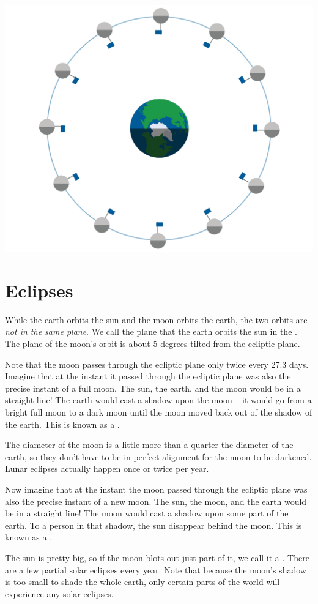 \includegraphics[width=.7\textwidth]{moonCircleRotate.png}



\section{Eclipses}

While the earth orbits the sun and the moon orbits the earth,  the two orbits are \emph{not in the same plane}.
We call the plane that the earth orbits the sun in the .   The plane of the moon's orbit is about  5 degrees tilted from the ecliptic plane.

Note that the moon passes through the ecliptic plane only twice every 27.3 days.   Imagine that at the instant it passed through the ecliptic plane was also the precise instant of a full moon.    The sun, the earth, and the moon would be in a straight line!  The earth would cast a shadow upon the moon -- it would go from a bright full moon to a dark moon until the moon moved back out of the shadow of the earth.   This is known as a .

The diameter of the moon is a little more than a quarter the diameter of the earth,  so they don't have to be in perfect alignment for the moon to be darkened.   Lunar eclipses actually happen once or twice per year.

Now imagine that at the instant the moon passed through the ecliptic plane was also the precise instant of a new moon.    The sun,  the moon, and the earth would be in a straight line!  The moon would cast a shadow upon some part of the earth.  To a person in that shadow,  the sun disappear behind the moon.   This is known as a .

The sun is pretty big,  so if the moon blots out just part of it,  we call it a .  There are a few partial solar eclipses every year.   Note that because the moon's shadow is too small to shade the whole earth,   only certain parts of the world will experience any solar eclipses. 


